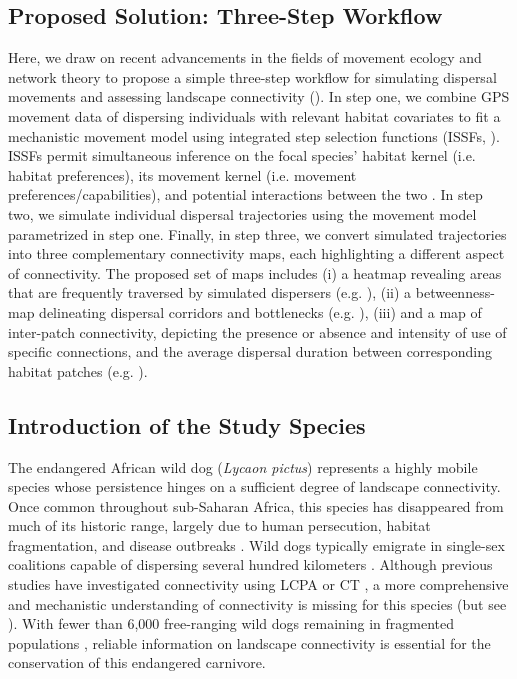 \documentclass[abstract=on,10pt,a4paper,bibliography=totocnumbered]{article}
\begin{document}
\subsection{Proposed Solution: Three-Step Workflow}
Here, we draw on recent advancements in the fields of movement ecology and
network theory to propose a simple three-step workflow for simulating dispersal
movements and assessing landscape connectivity (). In
step one, we combine GPS movement data of dispersing individuals with relevant
habitat covariates to fit a mechanistic movement model using integrated step
selection functions (ISSFs, \citealp{Avgar.2016}). ISSFs permit
simultaneous inference on the focal species' habitat kernel (i.e. habitat
preferences), its movement kernel (i.e. movement preferences/capabilities), and
potential interactions between the two \citep{Avgar.2016, Fieberg.2021}. In step
two,  we simulate individual dispersal trajectories using the movement model
parametrized in step one. Finally, in step three, we convert simulated
trajectories into three complementary connectivity maps, each highlighting a
different aspect of connectivity. The proposed set of maps includes (i) a
heatmap revealing areas that are frequently traversed by simulated dispersers
(e.g. \citealp{Hauenstein.2019, Zeller.2020}), (ii) a betweenness-map
delineating dispersal corridors and bottlenecks (e.g.
\citealp{BastilleRousseau.2018}), (iii) and a map of inter-patch connectivity,
depicting the presence or absence and intensity of use of specific connections,
and the average dispersal duration between corresponding habitat patches (e.g.
\citealp{Kanagaraj.2013}).

\subsection{Introduction of the Study Species}
The endangered African wild dog (\textit{Lycaon pictus}) represents a highly
mobile species whose persistence hinges on a  sufficient degree of landscape
connectivity. Once common throughout sub-Saharan Africa, this species has
disappeared from much of its historic range, largely due to human persecution,
habitat fragmentation, and disease outbreaks \citep{Woodroffe.2012}. Wild dogs
typically emigrate in single-sex coalitions \citep{McNutt.1996, Behr.2020}
capable of dispersing several hundred kilometers \citep{DaviesMostert.2012,
Masenga.2016, Cozzi.2020}. Although previous studies have investigated
connectivity using LCPA \citep{Hofmann.2021} or CT \citep{Brennan.2020}, a more
comprehensive and mechanistic understanding of connectivity is missing for this
species (but see \citealp{Creel.2020}). With fewer than 6,000 free-ranging wild
dogs remaining in fragmented populations \citep{Woodroffe.2012}, reliable
information on landscape connectivity is essential for the conservation of this
endangered carnivore.
\end{document}
